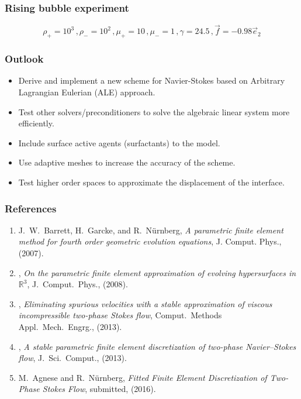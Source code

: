 \documentclass{beamer}
\begin{document}
\begin{frame}
\frametitle{Rising bubble experiment}

\begin{equation*}
\rho_+ = 10^3\,, \rho_- = 10^2\,, \mu_+ = 10\,, \mu_- = 1\,, \gamma = 24.5\,,
\vec f = -0.98\vec e_2
\end{equation*}

\centering

\end{frame}

\begin{frame}
\frametitle{Outlook}

\begin{itemize}
\item Derive and implement a new scheme for Navier-Stokes based on Arbitrary
Lagrangian Eulerian (ALE) approach.
\item Test other solvers/preconditioners to solve the algebraic linear system
more efficiently.
\item Include surface active agents (surfactants) to the model.
\item Use adaptive meshes to increase the accuracy of the scheme.
\item Test higher order spaces to approximate the displacement of the interface.
\end{itemize}
\end{frame}

\begin{frame}
\frametitle{References}

\begin{enumerate}
\item
{\sc J.~W.~Barrett, H.~Garcke, and R.~N\"urnberg}, {\em A parametric finite
element method for fourth order geometric evolution equations},
\blue J. Comput. Phys., \black (2007).

\item
\leavevmode\vrule height 2pt depth -1.6pt width 23pt,
{\em On the parametric finite element approximation of evolving hypersurfaces
in {${\mathbb R}^3$}},
\blue J.\ Comput.\ Phys., \black (2008).

\item
\leavevmode\vrule height 2pt depth -1.6pt width 23pt,
{\em Eliminating spurious velocities with a stable approximation of
viscous incompressible two-phase {S}tokes flow},
\blue Comput.\ Methods Appl.\ Mech.\ Engrg., \black (2013).

\item
\leavevmode\vrule height 2pt depth -1.6pt width 23pt,
{\em A stable parametric finite element discretization of two-phase
{N}avier--{S}tokes flow}, \blue J.\ Sci.\ Comput., \black (2013).

\item
{\sc M.~Agnese and R.~N\"urnberg}, {\em Fitted Finite Element Discretization of
Two-Phase {S}tokes Flow}, \blue submitted, \black (2016).
\end{enumerate}
\end{frame}
\end{document}
